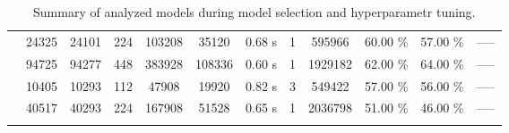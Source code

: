 \begin{table}[ht]
\begin{tabular}{ |c|c|c|c|c|c|c|c|c|c| }
 & 24325 & 24101 & 224 & 103208 & 35120 & 0.68 s & 1 & 595966 & 60.00 \% & 57.00 \% & ----- \\
 & 94725 & 94277 & 448 & 383928 & 108336 & 0.60 s & 1 & 1929182 & 62.00 \% & 64.00 \% & ----- \\
 & 10405 & 10293 & 112 & 47908 & 19920 & 0.82 s & 3 & 549422 & 57.00 \% & 56.00 \% & ----- \\
 & 40517 & 40293 & 224 & 167908 & 51528 & 0.65 s & 1 & 2036798 & 51.00 \% & 46.00 \% & ----- \\
\hline
\caption{Summary of analyzed models during model selection and hyperparametr tuning.}
\label{table1}
\end{tabular}
\end{table}
